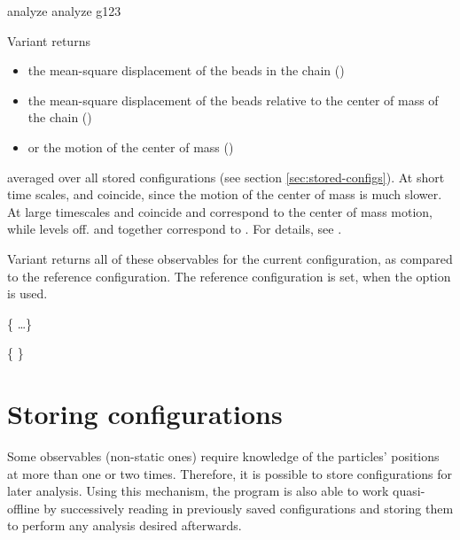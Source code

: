 \begin{essyntax}
   analyze  
   analyze g123  
\end{essyntax}

Variant  returns 
\begin{itemize}
\item the mean-square displacement of the beads in the
  chain ()
\item the mean-square displacement of the beads relative
  to the center of
  mass of the chain ()
\item or the motion of the center of mass ()
\end{itemize}
averaged over all stored configurations (see section
\vref{sec:stored-configs}). At short time scales,  and
 coincide, since the motion of the center of mass is much
slower.  At large timescales  and  coincide and
correspond to the center of mass motion, while  levels
off.  and  together correspond to . For
details, see \citet{grest86a}.

Variant  returns all of these observables for the current
configuration, as compared to the reference configuration. The
reference configuration is set, when the option  is used.

\begin{code}
  \{   \dots \}
\end{code}

\begin{code}
  \{    \}
\end{code}

\section{Storing configurations}
\label{sec:stored-configs}

Some observables (\ie non-static ones) require knowledge of the
particles' positions at more than one or two times. Therefore, it is
possible to store configurations for later analysis.  Using this
mechanism, the program is also able to work quasi-offline by
successively reading in previously saved configurations and storing
them to perform any analysis desired afterwards.

